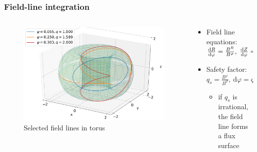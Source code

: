 \documentclass{beamer}
\begin{document}
\begin{frame}
\frametitle{Field-line integration}
\vspace{-0.5 cm}
\begin{columns}[onlytextwidth]
	\begin{column}{0.5\textwidth}
		\begin{center}
			\begin{figure}
				\includegraphics[trim={0 0cm 0 0cm},clip,width=1\textwidth]{FIGURES/field_lines_torus.pdf}
				\caption{Selected field lines in torus}
			\end{figure}
		\end{center}
	\end{column}
	\begin{column}{0.5\textwidth}
		\vspace{0 cm}
		\begin{center}
			\begin{itemize}
				\item Field line equations: $\frac{\textrm{d}R}{\textrm{d}\varphi} = \frac{B^R}{B^\varphi}, \hspace{0.1cm} \frac{\textrm{d}Z}{\textrm{d}\varphi} = \frac{B^Z}{B^\varphi}
				$
				\vspace{1cm}
				\item Safety factor: \newline $q_s = \frac{B^\varphi}{B^\vartheta},~\textrm{d}\varphi= q_s\textrm{d}\vartheta
				$
					\begin{itemize}
					\item if $q_s$ is irrational, the field line forms a flux surface
				\end{itemize}
			\end{itemize}
		\end{center}
	\end{column}
\end{columns}
\end{frame}
\end{document}
